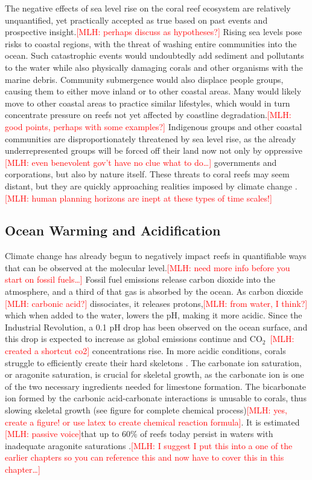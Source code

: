 \documentclass{book}\usepackage{knitr}
\newcommand{\red}[1]{\textcolor{red}{[MLH: #1]}}
\newcommand{\carbondioxide}{CO$_2$~}
\begin{document}
{The negative effects of sea level rise on the coral reef ecosystem are relatively unquantified, yet practically accepted as true based on past events and prospective insight.\red{perhaps discuss as hypotheses?} Rising sea levels pose risks to coastal regions, with the threat of washing entire communities into the ocean.  Such catastrophic events would undoubtedly add sediment and pollutants to the water while also physically damaging corals and other organisms with the marine debris. Community submergence would also displace people groups, causing them to either move inland or to other coastal areas. Many would likely move to other coastal areas to practice similar lifestyles, which would in turn concentrate pressure on reefs not yet affected by coastline degradation.\red{good points, perhaps with some examples?} Indigenous groups and other coastal communities are disproportionately threatened by sea level rise, as the already underrepresented groups will be forced off their land now not only by oppressive \red{even benevolent gov't have no clue what to do\ldots} governments and corporations, but also by nature itself. These threats to coral reefs may seem distant, but they are quickly approaching realities imposed by climate change \citep{Keller2009ClimateCC}.\red{human planning horizons are inept at these types of time scales!}

\subsection{Ocean Warming and Acidification}

Climate change has already begun to negatively impact reefs in quantifiable ways that can be observed at the molecular level.\red{need more info before you start on fossil fuels\ldots} Fossil fuel emissions release carbon dioxide into the atmosphere, and a third of that gas is absorbed by the ocean\citep{Keller2009ClimateCC}. As carbon dioxide \red{carbonic acid?} dissociates, it releases protons,\red{from water, I think?} which when added to the water, lowers the pH, making it more acidic. Since the Industrial Revolution, a 0.1 pH drop has been observed on the ocean surface, and this drop is expected to increase as global emissions continue and \carbondioxide \red{created a shortcut co2} concentrations rise. In more acidic conditions, corals struggle to efficiently create their hard skeletons \citep{Keller2009ClimateCC}. The carbonate ion saturation, or aragonite saturation, is crucial for skeletal growth, as the carbonate ion is one of the two necessary ingredients needed for limestone formation. The bicarbonate ion formed by the carbonic acid-carbonate interactions is unusable to corals, thus slowing skeletal growth (see figure for complete chemical process)\red{yes, create a figure! or use latex to create chemical reaction formula}. It is estimated \red{passive voice}that up to 60\% of reefs today persist in waters with inadequate aragonite saturations \citep{Ayala_2009}.\red{I suggest I put this into a one of the earlier chapters so you can reference this and now have to cover this in this chapter\ldots}

}
\end{document}
